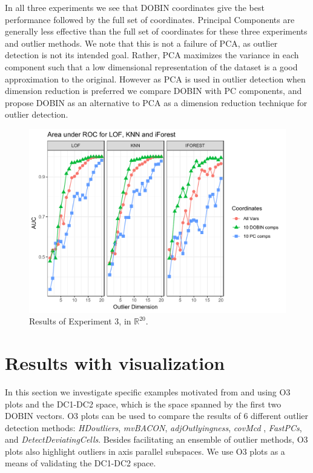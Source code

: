 \documentclass[a4paper,11pt]{article}
\begin{document}
In all three experiments we see that DOBIN coordinates give the best performance followed by the full set of coordinates. Principal Components are generally less effective than the full set of coordinates for these three experiments and outlier methods. We note that this is not a failure of PCA, as outlier detection is not its intended goal. Rather, PCA maximizes the variance in each component such that a low dimensional representation of the dataset is a good approximation to the original. However as PCA is used in outlier detection when dimension reduction is preferred we compare DOBIN with PC components, and propose DOBIN as an alternative to PCA as a dimension reduction technique for outlier detection. %

\begin{figure}[!ht]
	\centering
	\includegraphics[scale=0.5]{Exp3.pdf}
	\caption{Results of Experiment 3, in $\mathbb{R}^{20}$.}
	\label{fig:Exp3}
\end{figure}

\section{Results with visualization}\label{sec:ResWithVis}
In this section we investigate specific examples motivated from \cite{unwin2019multivariate} and \cite{wilkinson2017visualizing} using  O3 plots and the DC1-DC2 space, which is the space spanned by the first two DOBIN vectors. O3 plots \citep{unwin2019multivariate} can be used to compare the results of $6$ different outlier detection methods: \textit{HDoutliers},  \textit{mvBACON},  \textit{adjOutlyingness},  \textit{covMcd} , \textit{FastPCs},  and \textit{DetectDeviatingCells}. Besides facilitating an ensemble of outlier methods, O3 plots also highlight outliers in axis parallel subspaces. We use O3 plots as a means of validating the DC1-DC2 space.
\end{document}
